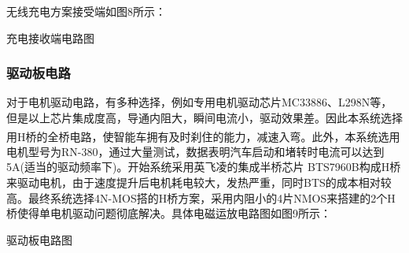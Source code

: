 \documentclass{article}%
\begin{document}
\begin{multicols}{2}
		无线充电方案接受端如图8所示：
		\begin{center}
			\caption{充电接收端电路图}		
		\end{center}
		
		\subsubsection{驱动板电路}
		
		对于电机驱动电路，有多种选择，例如专用电机驱动芯片MC33886、L298N等，但是以上芯片集成度高，导通内阻大，瞬间电流小，驱动效果差。因此本系统选择用H桥\textsuperscript{\cite{ref4}}的全桥电路，使智能车拥有及时刹住的能力，减速入弯。此外，本系统选用电机型号为RN-380，通过大量测试，数据表明汽车启动和堵转时电流可以达到5A(适当的驱动频率下)。开始系统采用英飞凌的集成半桥芯片 BTS7960B构成H桥来驱动电机，由于速度提升后电机耗电较大，发热严重，同时BTS的成本相对较高。最终系统选择4N-MOS搭的H桥方案，采用内阻小的4片NMOS来搭建的2个H桥使得单电机驱动问题彻底解决。具体电磁运放电路图如图9所示：

		\begin{center}
			\caption{驱动板电路图}		
		\end{center}
				

\end{multicols}
\end{document}
